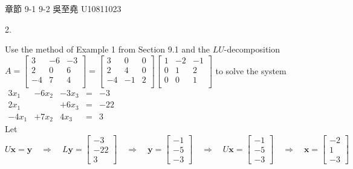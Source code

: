 \documentclass[12pt]{book}
\author{andersonwu2000}
\begin{document}
\begin{CJK}{UTF8}{bsmi}

\hfill 章節 9-1 9-2 吳至堯 U10811023


2. \begin{minipage}[t]{\dimexpr\linewidth-2em}
Use the method of Example 1 from Section 9.1 and the $LU$-decomposition \\
$A=\begin{bmatrix}
 3 & -6 & -3 \\
 2 &  0 &  6 \\
-4 &  7 &  4 \\
\end{bmatrix}=\begin{bmatrix}
 3 &  0 &  0 \\
 2 &  4 &  0 \\
-4 & -1 &  2 \\
\end{bmatrix}\begin{bmatrix}
 1 & -2 & -1 \\
 0 &  1 &  2 \\
 0 &  0 &  1 \\
\end{bmatrix}$ to solve the system $\begin{matrix}
3x_1 & -6x_2 & -3x_3 & = & -3 \\
2x_1 && +6x_3 & = & -22 \\
-4x_1 & +7x_2 & 4x_3 & = & 3
\end{matrix}$ \\
Let $U\textbf{x}=\textbf{y}\quad\Rightarrow\quad L\textbf{y}=\begin{bmatrix}
-3 \\ -22 \\ 3
\end{bmatrix}\quad\Rightarrow\quad\textbf{y}=\begin{bmatrix}
-1 \\ -5 \\ -3
\end{bmatrix}\quad\Rightarrow\quad U\textbf{x}=\begin{bmatrix}
-1 \\ -5 \\ -3
\end{bmatrix}\quad\Rightarrow\quad\textbf{x}=\begin{bmatrix}
-2 \\ 1 \\ -3
\end{bmatrix}$
\end{minipage}\\


\end{CJK}
\end{document}

